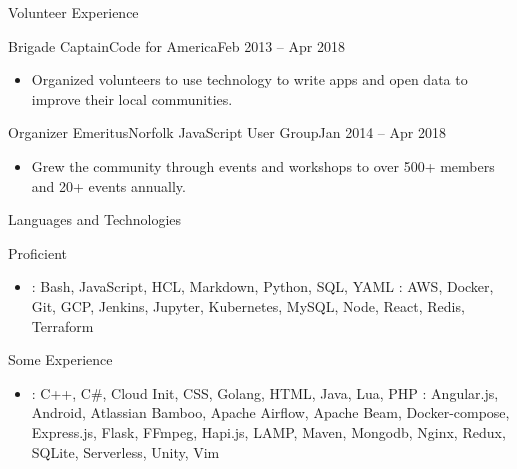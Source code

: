 \documentclass[]{mcdowellcv}
\begin{document}
    \begin{cvsection}{Volunteer Experience}
        \begin{cvsubsection}{Brigade Captain}{Code for America}{Feb 2013 – Apr 2018}
            \begin{itemize}
                \item Organized volunteers to use technology to write apps and open data to improve their local communities.
            \end{itemize}

        \end{cvsubsection}

        \begin{cvsubsection}{Organizer Emeritus}{Norfolk JavaScript User Group}{Jan 2014 – Apr 2018}
            \begin{itemize}
                \item Grew the community through events and workshops to over 500+ members and 20+ events annually.
            \end{itemize}
        \end{cvsubsection}
    \end{cvsection}

    \begin{cvsection}{Languages and Technologies}
        \begin{cvsubsection}{Proficient}{}{}
            \begin{itemize}
                    \item {}: Bash, JavaScript, HCL, Markdown, Python, SQL, YAML \newline
                    : AWS, Docker, Git, GCP, Jenkins, Jupyter, Kubernetes, MySQL, Node, React, Redis, Terraform
            \end{itemize}
        \end{cvsubsection}
        \begin{cvsubsection}{Some Experience}{}{}
            \begin{itemize}
                    \item {}: C++, C\#, Cloud Init, CSS, Golang, HTML, Java, Lua, PHP  \newline
                    : Angular.js, Android, Atlassian Bamboo, Apache Airflow, Apache Beam,  Docker-compose, \newline Express.js, Flask, FFmpeg, Hapi.js, LAMP, Maven, Mongodb, Nginx, Redux, SQLite, Serverless, Unity, Vim
            \end{itemize}
        \end{cvsubsection}
    \end{cvsection}
\end{document}

